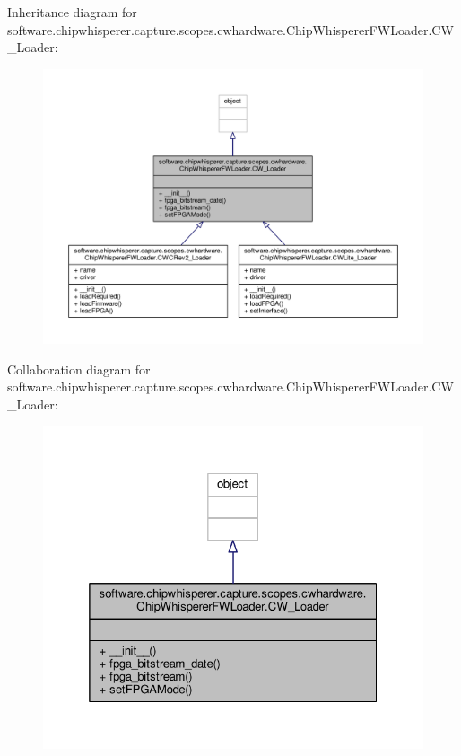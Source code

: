 Inheritance diagram for software.\+chipwhisperer.\+capture.\+scopes.\+cwhardware.\+Chip\+Whisperer\+F\+W\+Loader.\+C\+W\+\_\+\+Loader\+:\nopagebreak
\begin{figure}[H]
\begin{center}
\leavevmode
\includegraphics[width=350pt]{d9/d23/classsoftware_1_1chipwhisperer_1_1capture_1_1scopes_1_1cwhardware_1_1ChipWhispererFWLoader_1_1CW__Loader__inherit__graph}
\end{center}
\end{figure}


Collaboration diagram for software.\+chipwhisperer.\+capture.\+scopes.\+cwhardware.\+Chip\+Whisperer\+F\+W\+Loader.\+C\+W\+\_\+\+Loader\+:\nopagebreak
\begin{figure}[H]
\begin{center}
\leavevmode
\includegraphics[width=325pt]{d7/df0/classsoftware_1_1chipwhisperer_1_1capture_1_1scopes_1_1cwhardware_1_1ChipWhispererFWLoader_1_1CW__Loader__coll__graph}
\end{center}
\end{figure}


